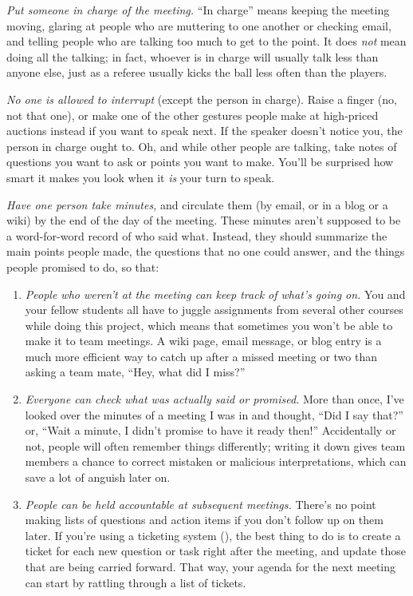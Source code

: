 \documentclass{report}
\begin{document}
\emph{Put someone in charge of the meeting.} ``In charge'' means
keeping the meeting moving, glaring at people who are muttering to one
another or checking email, and telling people who are talking too much
to get to the point.  It does \emph{not} mean doing all the talking;
in fact, whoever is in charge will usually talk less than anyone else,
just as a referee usually kicks the ball less often than the players.

\emph{No one is allowed to interrupt} (except the person in charge).
Raise a finger (no, not that one), or make one of the other gestures
people make at high-priced auctions instead if you want to speak next.
If the speaker doesn't notice you, the person in charge ought to.  Oh,
and while other people are talking, take notes of questions you want
to ask or points you want to make.  You'll be surprised how smart it
makes you look when it \emph{is} your turn to speak.

\emph{Have one person take minutes,} and circulate them (by email, or
in a blog or a wiki) by the end of the day of the meeting.  These
minutes aren't supposed to be a word-for-word record of who said what.
Instead, they should summarize the main points people made, the
questions that no one could answer, and the things people promised to
do, so that:

\begin{enumerate}

  \item \emph{People who weren't at the meeting can keep track of
  what's going on.}  You and your fellow students all have to juggle
  assignments from several other courses while doing this project,
  which means that sometimes you won't be able to make it to team
  meetings.  A wiki page, email message, or blog entry is a much more
  efficient way to catch up after a missed meeting or two than asking
  a team mate, ``Hey, what did I miss?''

  \item \emph{Everyone can check what was actually said or promised.}
  More than once, I've looked over the minutes of a meeting I was in
  and thought, ``Did I say that?'' or, ``Wait a minute, I didn't
  promise to have it ready then!''  Accidentally or not, people will
  often remember things differently; writing it down gives team
  members a chance to correct mistaken or malicious interpretations,
  which can save a lot of anguish later on.

  \item \emph{People can be held accountable at subsequent meetings.}
  There's no point making lists of questions and action items if you
  don't follow up on them later.  If you're using a ticketing system
  (), the best thing to do is to create a
  ticket for each new question or task right after the meeting, and
  update those that are being carried forward.  That way, your agenda
  for the next meeting can start by rattling through a list of
  tickets.

\end{enumerate}
\end{document}
